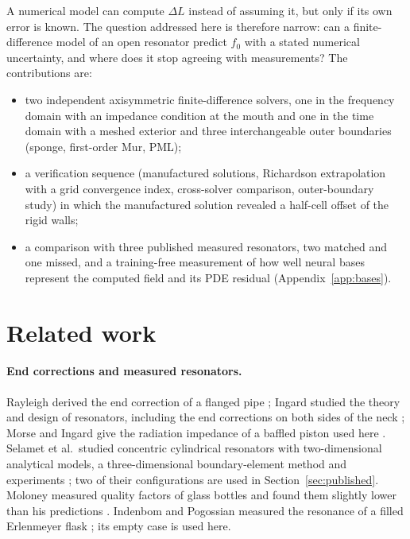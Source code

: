 \documentclass[11pt,a4paper]{article}
\begin{document}
A numerical model can compute $\Delta L$ instead of assuming it, but only if its own error
is known. The question addressed here is therefore narrow: can a finite-difference model of
an open resonator predict $f_0$ with a stated numerical uncertainty, and where does it stop
agreeing with measurements? The contributions are:
\begin{itemize}
  \item two independent axisymmetric finite-difference solvers, one in the frequency domain
    with an impedance condition at the mouth and one in the time domain with a meshed
    exterior and three interchangeable outer boundaries (sponge, first-order Mur, PML);
  \item a verification sequence (manufactured solutions, Richardson extrapolation with a
    grid convergence index, cross-solver comparison, outer-boundary study) in which the
    manufactured solution revealed a half-cell offset of the rigid walls;
  \item a comparison with three published measured resonators, two matched and one missed,
    and a training-free measurement of how well neural bases represent the computed field
    and its PDE residual (Appendix~\ref{app:bases}).
\end{itemize}

\section{Related work}

\paragraph{End corrections and measured resonators.}
Rayleigh derived the end correction of a flanged pipe \citep{rayleigh1896}; Ingard studied
the theory and design of resonators, including the end corrections on both sides of the neck
\citep{ingard1953}; Morse and Ingard give the radiation impedance of a baffled piston used
here \citep{morse1968}. Selamet et al.\ studied concentric cylindrical resonators with
two-dimensional analytical models, a three-dimensional boundary-element method and
experiments \citep{selamet1997}; two of their configurations are used in
Section~\ref{sec:published}. Moloney measured quality factors of glass bottles and found
them slightly lower than his predictions \citep{moloney2004}. Indenbom and Pogossian
measured the resonance of a filled Erlenmeyer flask \citep{indenbom2023}; its empty case is
used here.
\end{document}
